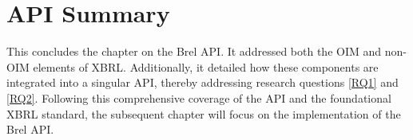 

\section{API Summary}

This concludes the chapter on the Brel API.
It addressed both the OIM and non-OIM elements of XBRL.
Additionally, it detailed how these components are integrated into a singular API, thereby addressing research questions \ref{RQ1} and \ref{RQ2}.
Following this comprehensive coverage of the API and the foundational XBRL standard, the subsequent chapter will focus on the implementation of the Brel API.